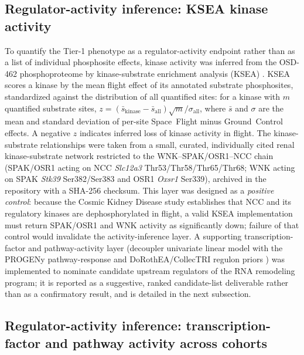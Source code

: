 \documentclass[11pt]{article}
\newcommand{\gene}[1]{\textit{#1}}
\begin{document}
\subsection{Regulator-activity inference: KSEA kinase activity}

To quantify the Tier-1 phenotype as a regulator-activity endpoint rather than as a list of individual phosphosite effects, kinase activity was inferred from the OSD-462 phosphoproteome by kinase-substrate enrichment analysis (KSEA) \citep{casado2013kinase}. KSEA scores a kinase by the mean flight effect of its annotated substrate phosphosites, standardized against the distribution of all quantified sites: for a kinase with $m$ quantified substrate sites, $z = (\bar{s}_{\mathrm{kinase}} - \bar{s}_{\mathrm{all}})\sqrt{m}/\sigma_{\mathrm{all}}$, where $\bar{s}$ and $\sigma$ are the mean and standard deviation of per-site Space~Flight minus Ground~Control effects. A negative $z$ indicates inferred loss of kinase activity in flight. The kinase-substrate relationships were taken from a small, curated, individually cited renal kinase-substrate network restricted to the WNK--SPAK/OSR1--NCC chain (SPAK/OSR1 acting on NCC \gene{Slc12a3} Thr53/Thr58/Thr65/Thr68; WNK acting on SPAK \gene{Stk39} Ser382/Ser383 and OSR1 \gene{Oxsr1} Ser339), archived in the repository with a SHA-256 checksum. This layer was designed as a \emph{positive control}: because the Cosmic Kidney Disease study \citep{siew2024cosmic} establishes that NCC and its regulatory kinases are dephosphorylated in flight, a valid KSEA implementation must return SPAK/OSR1 and WNK activity as significantly down; failure of that control would invalidate the activity-inference layer. A supporting transcription-factor and pathway-activity layer (decoupler univariate linear model with the PROGENy pathway-response and DoRothEA/CollecTRI regulon priors \citep{badia2022decoupler,schubert2018progeny,garcia2019benchmark}) was implemented to nominate candidate upstream regulators of the RNA remodeling program; it is reported as a suggestive, ranked candidate-list deliverable rather than as a confirmatory result, and is detailed in the next subsection.

\subsection{Regulator-activity inference: transcription-factor and pathway activity across cohorts}
\end{document}
